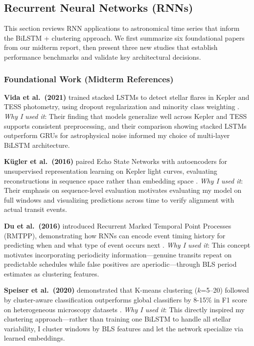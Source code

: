 \subsection{Recurrent Neural Networks (RNNs)}

This section reviews RNN applications to astronomical time series that inform the BiLSTM + clustering approach. We first summarize six foundational papers from our midterm report, then present three new studies that establish performance benchmarks and validate key architectural decisions.

\subsubsection{Foundational Work (Midterm References)}

\textbf{Vida et al.\ (2021)} trained stacked LSTMs to detect stellar flares in Kepler and TESS photometry, using dropout regularization and minority class weighting \cite{Vida2021findingflaresrecurrent}. \textit{Why I used it}: Their finding that models generalize well across Kepler and TESS supports consistent preprocessing, and their comparison showing stacked LSTMs outperform GRUs for astrophysical noise informed my choice of multi-layer BiLSTM architecture.

\textbf{K\"ugler et al.\ (2016)} paired Echo State Networks with autoencoders for unsupervised representation learning on Kepler light curves, evaluating reconstructions in sequence space rather than embedding space \cite{kugler2016explorativeapproachkepler}. \textit{Why I used it}: Their emphasis on sequence-level evaluation motivates evaluating my model on full windows and visualizing predictions across time to verify alignment with actual transit events.

\textbf{Du et al.\ (2016)} introduced Recurrent Marked Temporal Point Processes (RMTPP), demonstrating how RNNs can encode event timing history for predicting when and what type of event occurs next \cite{Du2016markedtemporalpoint}. \textit{Why I used it}: This concept motivates incorporating periodicity information---genuine transits repeat on predictable schedules while false positives are aperiodic---through BLS period estimates as clustering features.

\textbf{Speiser et al.\ (2020)} demonstrated that K-means clustering ($k$=5--20) followed by cluster-aware classification outperforms global classifiers by 8-15\% in F1 score on heterogeneous microscopy datasets \cite{Speiser2020clustering}. \textit{Why I used it}: This directly inspired my clustering approach---rather than training one BiLSTM to handle all stellar variability, I cluster windows by BLS features and let the network specialize via learned embeddings.

